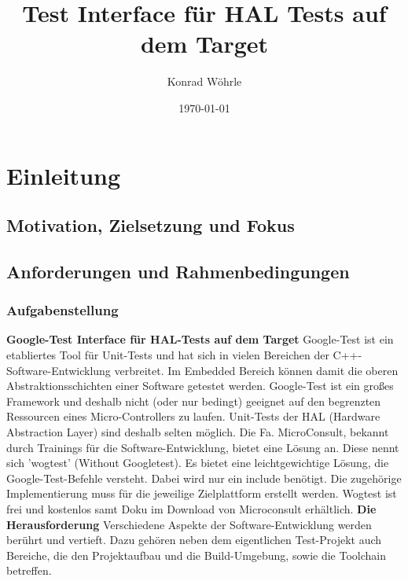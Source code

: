 \documentclass[12pt,a4paper]{article}
\title{Test Interface für HAL Tests auf dem Target}
\author{Konrad Wöhrle}
\date{\today}
\begin{document}
\maketitle
\tableofcontents
\newpage
\section{Einleitung}
\subsection{Motivation, Zielsetzung und Fokus}
\subsection{Anforderungen und Rahmenbedingungen}



\newpage
\subsubsection{Aufgabenstellung}
\textbf{Google-Test Interface für HAL-Tests auf dem Target}
\newline
Google-Test ist ein etabliertes Tool für Unit-Tests und hat sich in vielen Bereichen der C++-Software-Entwicklung verbreitet. Im Embedded Bereich können damit die oberen Abstraktionsschichten einer Software getestet werden. Google-Test ist ein großes Framework und deshalb nicht (oder nur bedingt) geeignet auf den begrenzten Ressourcen eines Micro-Controllers zu laufen. Unit-Tests der HAL (Hardware Abstraction Layer) sind deshalb selten möglich.
Die Fa. MicroConsult, bekannt durch Trainings für die Software-Entwicklung, bietet eine Lösung an. Diese nennt sich 'wogtest' (Without Googletest). Es bietet eine leichtgewichtige Lösung, die Google-Test-Befehle versteht. Dabei wird nur ein include benötigt. Die zugehörige Implementierung muss für die jeweilige Zielplattform erstellt werden.
Wogtest ist frei und kostenlos samt Doku im Download von Microconsult erhältlich.
\newline\newline
\textbf{Die Herausforderung}
\newline
Verschiedene Aspekte der Software-Entwicklung werden berührt und vertieft. Dazu gehören neben dem eigentlichen Test-Projekt auch Bereiche, die den Projektaufbau und die Build-Umgebung, sowie die Toolchain betreffen. 
\newline
\end{document}
